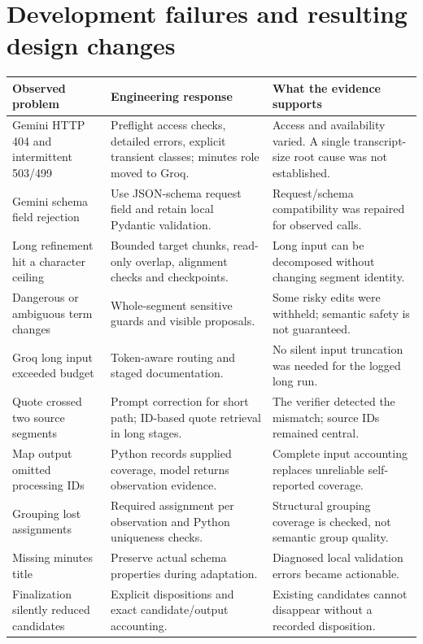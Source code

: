 \documentclass[11pt,a4paper]{article}
\begin{document}
\section{Development failures and resulting design changes}
\small
\begin{longtable}{@{}>{\raggedright\arraybackslash}p{}>{\raggedright\arraybackslash}p{}>{\raggedright\arraybackslash}p{}@{}}
\toprule Observed problem & Engineering response & What the evidence supports\\\midrule\endhead
Gemini HTTP 404 and intermittent 503/499 & Preflight access checks, detailed errors, explicit transient classes; minutes role moved to Groq. & Access and availability varied. A single transcript-size root cause was not established.\\[5pt]
Gemini schema field rejection & Use JSON-schema request field and retain local Pydantic validation. & Request/schema compatibility was repaired for observed calls.\\[5pt]
Long refinement hit a character ceiling & Bounded target chunks, read-only overlap, alignment checks and checkpoints. & Long input can be decomposed without changing segment identity.\\[5pt]
Dangerous or ambiguous term changes & Whole-segment sensitive guards and visible proposals. & Some risky edits were withheld; semantic safety is not guaranteed.\\[5pt]
Groq long input exceeded budget & Token-aware routing and staged documentation. & No silent input truncation was needed for the logged long run.\\[5pt]
Quote crossed two source segments & Prompt correction for short path; ID-based quote retrieval in long stages. & The verifier detected the mismatch; source IDs remained central.\\[5pt]
Map output omitted processing IDs & Python records supplied coverage, model returns observation evidence. & Complete input accounting replaces unreliable self-reported coverage.\\[5pt]
Grouping lost assignments & Required assignment per observation and Python uniqueness checks. & Structural grouping coverage is checked, not semantic group quality.\\[5pt]
Missing minutes title & Preserve actual schema properties during adaptation. & Diagnosed local validation errors became actionable.\\[5pt]
Finalization silently reduced candidates & Explicit dispositions and exact candidate/output accounting. & Existing candidates cannot disappear without a recorded disposition.\\[5pt]

\end{longtable}
\end{document}
